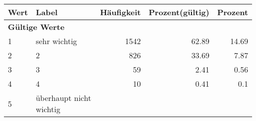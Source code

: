      \begin{longtable}{lXrrr}
     \toprule
     \textbf{Wert} & \textbf{Label} & \textbf{Häufigkeit} & \textbf{Prozent(gültig)} & \textbf{Prozent} \\
     \endhead
     \midrule
     \multicolumn{5}{l}{\textbf{Gültige Werte}}\\

     1 &
     \multicolumn{1}{X}{ sehr wichtig   } &


       \num{1542} &
       \num[round-mode=places,round-precision=2]{62.89} &
         \num[round-mode=places,round-precision=2]{14.69} \\

     2 &
     \multicolumn{1}{X}{ 2   } &


       \num{826} &
       \num[round-mode=places,round-precision=2]{33.69} &
         \num[round-mode=places,round-precision=2]{7.87} \\

     3 &
     \multicolumn{1}{X}{ 3   } &


       \num{59} &
       \num[round-mode=places,round-precision=2]{2.41} &
         \num[round-mode=places,round-precision=2]{0.56} \\

     4 &
     \multicolumn{1}{X}{ 4   } &


       \num{10} &
       \num[round-mode=places,round-precision=2]{0.41} &
         \num[round-mode=places,round-precision=2]{0.1} \\

     5 &
     \multicolumn{1}{X}{ überhaupt nicht wichtig   } &



\end{longtable}
